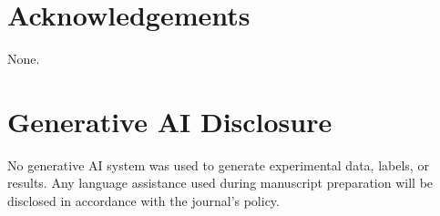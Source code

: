 \documentclass[10pt]{article}
\begin{document}
\section*{Acknowledgements}
None.

\section*{Generative AI Disclosure}
No generative AI system was used to generate experimental data, labels, or
results. Any language assistance used during manuscript preparation will be
disclosed in accordance with the journal's policy.



\end{document}
